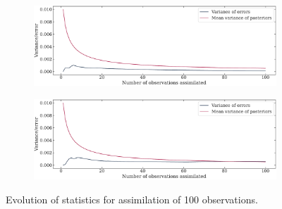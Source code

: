 \documentclass[parskip=half,DIV=12]{scrartcl}
\begin{document}
\begin{figure}[h]
   \centering

   \begin{subfigure}[c]{\textwidth}
      \includegraphics[width=\textwidth]{figures/stats_point1_var01.pdf}
   \end{subfigure}
    
   \bigskip
    
   \begin{subfigure}[c]{\textwidth}
      \includegraphics[width=\textwidth]{figures/stats_point2_var01.pdf}
   \end{subfigure}

   \caption{Evolution of statistics for assimilation of 100 observations.}
\end{figure}
 
\end{document}
